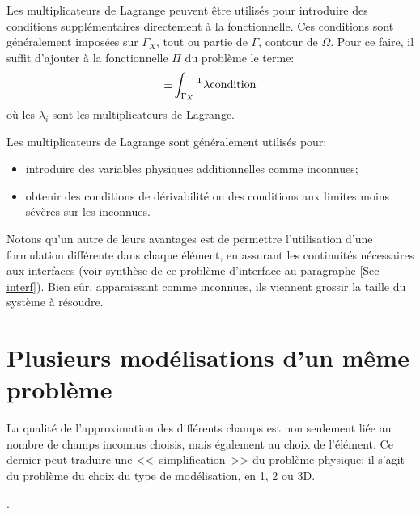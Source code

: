 \bigskip
Les multiplicateurs de Lagrange 
peuvent ê{}tre utilisé{}s pour introduire
des conditions supplé{}mentaires directement à{} la fonctionnelle.
Ces conditions sont gé{}né{}ralement imposé{}es sur $\Gamma_X$, tout ou
partie de $\Gamma$, contour de $\Omega$.
Pour ce faire, il suffit d'ajouter à{} la fonctionnelle $\Pi$
du problè{}me le terme:
\begin{equation}
   \pm\displaystyle\int_{\Gamma_X} {}^\mathrm{T}\mathbf{\lambda}\mathbf{\text{condition}}
\end{equation}
où{} les $\lambda_i$ sont les multiplicateurs de Lagrange.

\medskip
Les multiplicateurs de Lagrange 
sont gé{}né{}ralement utilisé{}s pour:
\begin{itemize}
   \item introduire des variables physiques additionnelles comme
         inconnues;
   \item obtenir des conditions de dé{}rivabilité{} ou des conditions aux
         limites moins sé{}vè{}res sur les inconnues.
\end{itemize}

\medskip
Notons qu'un autre de leurs avantages est de permettre l'utilisation d'une formulation diffé{}rente 
dans chaque é{}lé{}ment, en assurant les continuité{}s né{}cessaires aux interfaces (voir synthèse 
de ce problème d'interface au paragraphe \ref{Sec-interf}).
Bien sûr, apparaissant comme inconnues, ils viennent grossir la taille du systè{}me à
résoudre.










\medskip
\section{Plusieurs modélisations d'un même problème}\label{Sec-PlusModel}

La qualité de l'approximation des différents champs est non seulement liée
au nombre de champs inconnus choisis, mais également au choix de l'élément.
Ce dernier peut traduire une <<~simplification~>> du problème physique: 
il s'agit du problème du choix du type de modélisation, en 1, 2 ou 3D.

.

